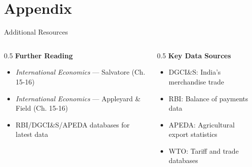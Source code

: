 \documentclass[
  ignorenonframetext,
  aspectratio=169,
]{beamer}
\makeatletter
\providecommand{\tightlist}{%
  \setlength{\itemsep}{0pt}\setlength{\parskip}{0pt}}
\let\quarto@originallabel\label
\DeclareRobustCommand*{\label}[1]{\quarto@originallabel{#1}}
\makeatother
\begin{document}
\section{Appendix}\label{appendix}

\begin{frame}{Additional Resources}
\label{additional-resources}
\begin{columns}[T]
\begin{column}{0.5\linewidth}
\textbf{Further Reading}

\begin{itemize}
\tightlist
\item
  \emph{International Economics} --- Salvatore (Ch. 15-16)
\item
  \emph{International Economics} --- Appleyard \& Field (Ch. 15-16)
\item
  RBI/DGCI\&S/APEDA databases for latest data
\end{itemize}
\end{column}

\begin{column}{0.5\linewidth}
\textbf{Key Data Sources}

\begin{itemize}
\tightlist
\item
  DGCI\&S: India's merchandise trade
\item
  RBI: Balance of payments data\\
\item
  APEDA: Agricultural export statistics
\item
  WTO: Tariff and trade databases
\end{itemize}
\end{column}
\end{columns}
\end{frame}
\end{document}

